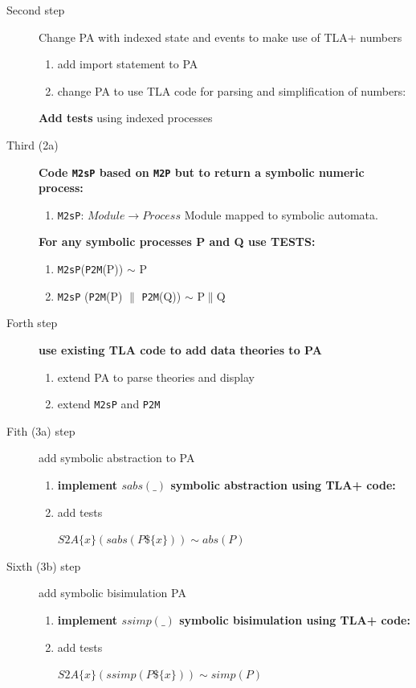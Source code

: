 \documentclass[]{article}
\begin{document}
\begin{description}
    
\item [Second step]  Change PA with indexed state and events   to make use of TLA+ numbers
\begin{enumerate}
 \item add import statement to PA
 \item{change  PA  to use  TLA code for parsing and  simplification of numbers:}   
 
\end{enumerate}

 {\bf Add tests} using indexed processes

\item [Third  (2a) ]{\bf Code   \verb|M2sP| based on \verb|M2P| but to return a symbolic numeric process: }  
\begin{enumerate}
\item \verb|M2sP|: $Module \rightarrow Process $ Module mapped to symbolic  automata.
 
\end{enumerate} 
 {\bf For any symbolic processes P and Q use TESTS:  }  
    \begin{enumerate}
    \item  \verb|M2sP|(\verb|P2M|(P)) $\sim$ P
    \item  \verb|M2sP| (\verb|P2M|(P) $\parallel$ \verb|P2M|(Q)) $\sim$ P$\parallel$Q
    \end{enumerate}  

\item [Forth step]  {\bf use existing TLA code to add data theories to PA }
\begin{enumerate}
 \item extend   PA to parse theories and display
 \item extend  \verb|M2sP| and \verb|P2M|  
\end{enumerate}

\item [Fith (3a) step]  add symbolic abstraction to  PA
\begin{enumerate}
 \item{\bf  implement $sabs(\_)$ symbolic abstraction  using TLA+ code: }   
 \item add tests  
 
 $S2A\{x\}(sabs(P\$\{x\})) \sim abs(P)$
\end{enumerate}

\item [Sixth (3b) step]  add symbolic bisimulation   PA
\begin{enumerate}
 \item{\bf  implement $ssimp(\_)$ symbolic bisimulation  using TLA+ code: }   
 \item add tests  
 
 $S2A\{x\}(ssimp(P\$\{x\})) \sim simp(P)$
\end{enumerate}

\end{description}
   
\end{document}
